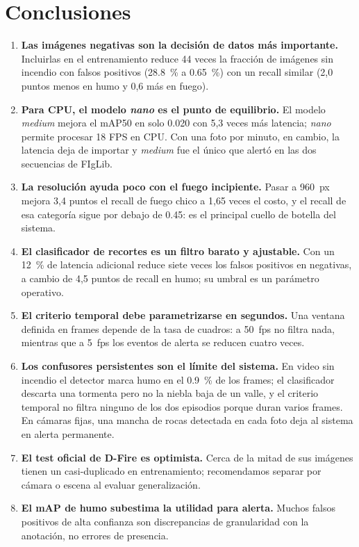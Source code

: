\documentclass[conference,a4paper]{IEEEtran}
\begin{document}
\section{Conclusiones}

\begin{enumerate}
\item \textbf{Las imágenes negativas son la decisión de datos más importante.} Incluirlas en el entrenamiento reduce 44 veces la fracción de imágenes sin incendio con falsos positivos (\SI{28.8}{\percent} a \SI{0.65}{\percent}) con un recall similar (2,0 puntos menos en humo y 0,6 más en fuego).
\item \textbf{Para CPU, el modelo \textit{nano} es el punto de equilibrio.} El modelo \textit{medium} mejora el mAP50 en solo \num{0.020} con 5,3 veces más latencia; \textit{nano} permite procesar 18 FPS en CPU. Con una foto por minuto, en cambio, la latencia deja de importar y \textit{medium} fue el único que alertó en las dos secuencias de FIgLib.
\item \textbf{La resolución ayuda poco con el fuego incipiente.} Pasar a \SI{960}{px} mejora 3,4 puntos el recall de fuego chico a 1,65 veces el costo, y el recall de esa categoría sigue por debajo de \num{0.45}: es el principal cuello de botella del sistema.
\item \textbf{El clasificador de recortes es un filtro barato y ajustable.} Con un \SI{12}{\percent} de latencia adicional reduce siete veces los falsos positivos en negativas, a cambio de 4,5 puntos de recall en humo; su umbral es un parámetro operativo.
\item \textbf{El criterio temporal debe parametrizarse en segundos.} Una ventana definida en frames depende de la tasa de cuadros: a \SI{50}{fps} no filtra nada, mientras que a \SI{5}{fps} los eventos de alerta se reducen cuatro veces.
\item \textbf{Los confusores persistentes son el límite del sistema.} En video sin incendio el detector marca humo en el \SI{0.9}{\percent} de los frames; el clasificador descarta una tormenta pero no la niebla baja de un valle, y el criterio temporal no filtra ninguno de los dos episodios porque duran varios frames. En cámaras fijas, una mancha de rocas detectada en cada foto deja al sistema en alerta permanente.
\item \textbf{El test oficial de D-Fire es optimista.} Cerca de la mitad de sus imágenes tienen un casi-duplicado en entrenamiento; recomendamos separar por cámara o escena al evaluar generalización.
\item \textbf{El mAP de humo subestima la utilidad para alerta.} Muchos falsos positivos de alta confianza son discrepancias de granularidad con la anotación, no errores de presencia.
\end{enumerate}
\end{document}
